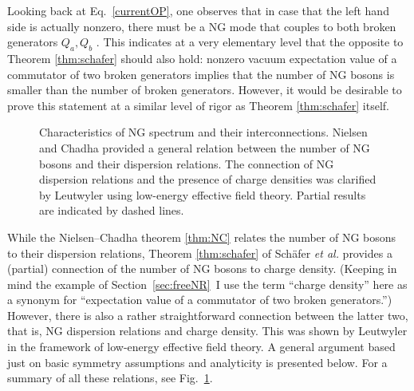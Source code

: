 \documentclass[final,3p,times,12pt,a4paper,sort&compress]{elsarticle}
\begin{document}
Looking back at Eq.~\eqref{currentOP}, one observes that in case that the left
hand side is actually nonzero, there must be a NG mode that couples to both
broken generators $Q_a,Q_b$ \cite{Brauner:2005di}. This indicates at a very
elementary level that the opposite to Theorem \ref{thm:schafer} should also
hold: nonzero vacuum expectation value of a commutator of two broken generators
implies that the number of NG bosons is smaller than the number of broken
generators. However, it would be desirable to prove this statement at a similar
level of rigor as Theorem \ref{thm:schafer} itself.

\begin{figure}
\begin{center}
\end{center}
\caption{Characteristics of NG spectrum and their interconnections. Nielsen
and Chadha \cite{Nielsen:1975hm} provided a general relation between the number
of NG bosons and their dispersion relations. The connection of NG dispersion
relations and the presence of charge densities was clarified by Leutwyler
\cite{Leutwyler:1993gf} using low-energy effective field theory. Partial results
are indicated by dashed lines.}
\label{fig:NGBchar}
\end{figure}
While the Nielsen--Chadha theorem \ref{thm:NC} relates the number of NG bosons
to their dispersion relations, Theorem \ref{thm:schafer} of Sch\"afer
\emph{et al.} provides a (partial) connection of the number of NG bosons to
charge density. (Keeping in mind the example of Section~\ref{sec:freeNR}\ I use
the term ``charge density'' here as a synonym for ``expectation value of a
commutator of two broken generators.'') However, there is also a rather
straightforward connection between the latter two, that is, NG dispersion
relations and charge density. This was shown by Leutwyler
\cite{Leutwyler:1993gf} in the framework of low-energy effective field theory.
A general argument based just on basic symmetry assumptions and analyticity is
presented below. For a summary of all these relations, see
Fig.~\ref{fig:NGBchar}.
\end{document}
